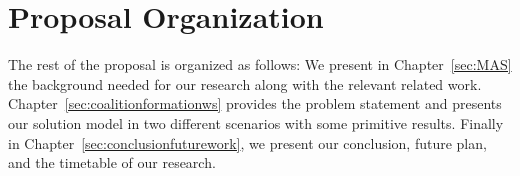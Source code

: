 \section{Proposal Organization}\label{sec:outline}
The rest of the proposal is organized as follows: We present in Chapter~\ref{sec:MAS} the background
needed for our research along with the relevant related work. Chapter~\ref{sec:coalitionformationws} provides the problem statement and presents our solution model in two
different scenarios with some primitive results. Finally in Chapter~\ref{sec:conclusionfuturework}, we present our conclusion, future plan, and the timetable of our research.

